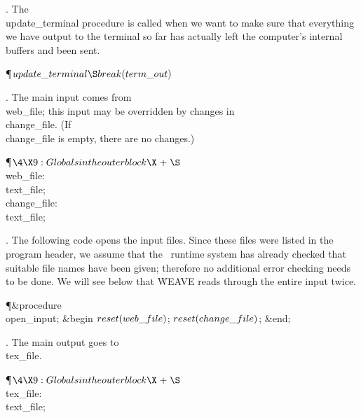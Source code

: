 . The \\{update\_terminal} procedure is called when we want
to make sure that everything we have output to the terminal so far has
actually left the computer's internal buffers and been sent.

\Y\P\D {}$\\{update\_terminal}\S\\{break}(\\{term\_out})$\par
\fi

. The main input comes from \\{web\_file}; this input may be overridden
by changes in \\{change\_file}. (If \\{change\_file} is empty, there are no
changes.)

\Y\P$\4\X9:Globals in the outer block\X\mathrel{+}\S$\6
\4\\{web\_file}: \\{text\_file};\6
\4\\{change\_file}: \\{text\_file};\par
\fi

. The following code opens the input files.  Since these files were listed
in the program header, we assume that the \PASCAL\ runtime system has
already checked that suitable file names have been given; therefore no
additional error checking needs to be done. We will see below that
\.{WEAVE} reads through the entire input twice.

\Y\P\4\&{procedure}\1\  \\{open\_input};\2\6
\&{begin} $\\{reset}(\\{web\_file})$;\5
$\\{reset}(\\{change\_file})$;\6
\&{end};\par
\fi

. The main output goes to \\{tex\_file}.

\Y\P$\4\X9:Globals in the outer block\X\mathrel{+}\S$\6
\4\\{tex\_file}: \\{text\_file};\par
\fi


